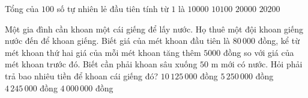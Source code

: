 \begin{ex}%
	Tổng của $100$ số tự nhiên lẻ đầu tiên tính từ $1$ là
	\choice
	{\True $10000$}
	{$10100$}
	{$20000$}
	{$20200$}
\end{ex}
\begin{ex}%
	Một gia đình cần khoan một cái giếng để lấy nước. Họ thuê một đội khoan giếng nước đến để khoan giếng. Biết giá của mét khoan đầu tiên là $80\,000$ đồng, kể từ mét khoan thứ hai giá của mỗi mét khoan tăng thêm $5000$ đồng so với giá của mét khoan trước đó. Biết cần phải khoan sâu xuống $50$ m mới có nước. Hỏi phải trả bao nhiêu tiền để khoan cái giếng đó?
	\choice
	{\True $10\, 125\,000$ đồng}
	{$5\, 250\,000$ đồng}
	{$4\, 245\,000$ đồng}
	{$4\, 000\,000$ đồng}
\end{ex}
